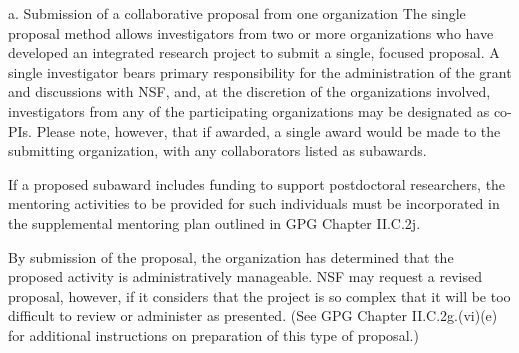 \documentclass[pdftex,12pt,fullpage,oneside]{amsart}
\begin{document}
a. Submission of a collaborative proposal from one organization The
single proposal method allows investigators from two or more
organizations who have developed an integrated research project to
submit a single, focused proposal.  A single investigator bears
primary responsibility for the administration of the grant and
discussions with NSF, and, at the discretion of the organizations
involved, investigators from any of the participating organizations
may be designated as co-PIs.  Please note, however, that if awarded, a
single award would be made to the submitting organization, with any
collaborators listed as subawards.

If a proposed subaward includes funding to support postdoctoral
researchers, the mentoring activities to be provided for such
individuals must be incorporated in the supplemental mentoring plan
outlined in GPG Chapter II.C.2j.

By submission of the proposal, the organization has determined that
the proposed activity is administratively manageable.  NSF may request
a revised proposal, however, if it considers that the project is so
complex that it will be too difficult to review or administer as
presented.  (See GPG Chapter II.C.2g.(vi)(e) for additional
instructions on preparation of this type of proposal.)


\end{document}
